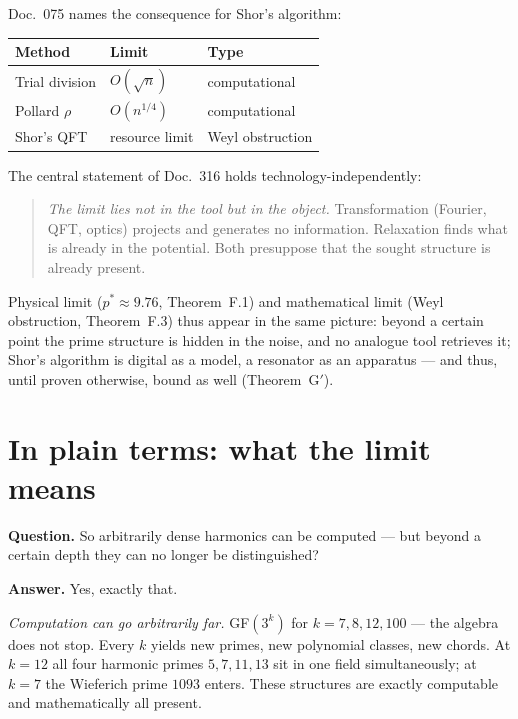 Doc.~075 names the consequence for Shor's algorithm:

\begin{center}
\begin{tabular}{@{}lll@{}}
\toprule
Method & Limit & Type \\
\midrule
Trial division & $O(\sqrt{n})$ & computational \\
Pollard $\rho$ & $O(n^{1/4})$ & computational \\
Shor's QFT & resource limit & Weyl obstruction \\
\bottomrule
\end{tabular}
\end{center}

The central statement of Doc.~316 holds technology-independently:
\begin{quote}
\emph{The limit lies not in the tool but in the object.}
Transformation (Fourier, QFT, optics) projects and generates no information.
Relaxation finds what is already in the potential.
Both presuppose that the sought structure is already present.
\end{quote}

Physical limit ($p^* \approx 9.76$, Theorem~F.1) and mathematical limit
(Weyl obstruction, Theorem~F.3) thus appear in the same picture: beyond a
certain point the prime structure is hidden in the noise, and no analogue tool
retrieves it; Shor's algorithm is digital as a model,
a resonator as an apparatus --- and thus, until proven otherwise, bound as well (Theorem~G$'$).

\section{In plain terms: what the limit means}

\textbf{Question.} So arbitrarily dense harmonics can be computed --- but
beyond a certain depth they can no longer be distinguished?

\textbf{Answer.} Yes, exactly that.

\emph{Computation can go arbitrarily far.} GF$(3^k)$ for $k = 7, 8, 12, 100$
--- the algebra does not stop. Every $k$ yields new primes, new polynomial
classes, new chords. At $k = 12$ all four harmonic primes $5, 7, 11, 13$ sit
in one field simultaneously; at $k = 7$ the Wieferich prime $1093$ enters.
These structures are exactly computable and mathematically all present.

